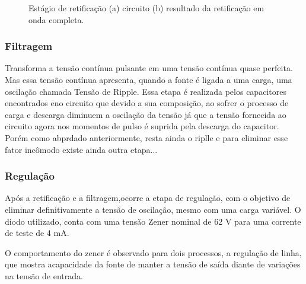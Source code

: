 \documentclass[a4paper,12pt,oneside,openany,table,xcdraw]{article}
\begin{document}
\begin{figure}[H]
\centering
{}\hfill
{}
\caption{Estágio de retificação (a) circuito (b) resultado da retificação em onda completa.}
\label{fonte:retificacao}
\end{figure}

\subsubsection{Filtragem}
Transforma a tensão contínua pulsante em uma tensão contínua quase perfeita. Mas essa tensão contínua apresenta, quando a fonte é ligada a uma carga, uma oscilação chamada Tensão de Ripple. Essa etapa é realizada pelos capacitores encontrados eno circuito que devido a sua composição, ao sofrer o processo de carga e descarga diminuem a oscilação da tensão já que a tensão fornecida ao circuito agora nos momentos de pulso é suprida pela descarga do capacitor. Porém como abprdado anteriormente, resta ainda o riplle e para eliminar esse fator incômodo existe ainda outra etapa...

\subsubsection{Regulação}
Após a retificação e a filtragem,ocorre a etapa de regulação, com o objetivo de eliminar definitivamente a tensão de oscilação, mesmo com uma carga variável. O diodo utilizado, conta com uma tensão Zener nominal de 62 V para uma corrente de teste de 4 mA.

O comportamento do zener é observado para dois processos, a regulação de linha, que mostra acapacidade da fonte de manter a tensão de saída diante de variações na tensão de entrada.
\end{document}

